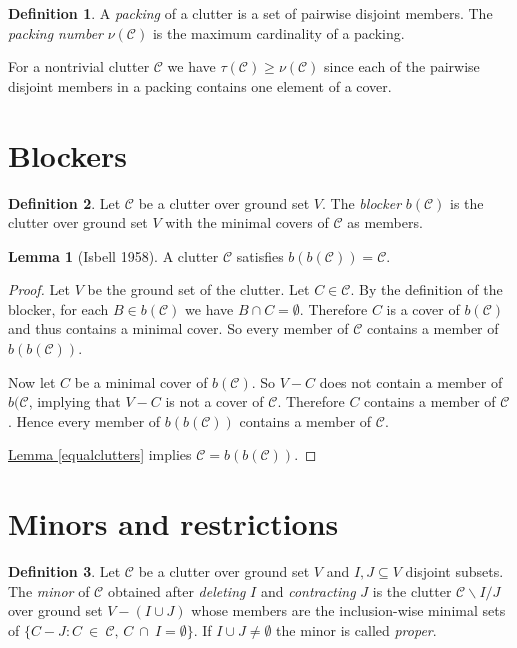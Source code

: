 \documentclass[a4paper, 12pt, twoside=false]{scrbook}
\theoremstyle{definition}
\newtheorem*{definition}{Definition}
\newtheorem{lemma}[theorem]{Lemma}
\begin{document}
\begin{definition}
    A \emph{packing} of a clutter is a set of pairwise disjoint members.
    The \emph{packing number} $\nu(\mathcal{C})$ is the maximum cardinality of a packing.
\end{definition}

For a nontrivial clutter $\mathcal{C}$ we have $\tau(\mathcal{C}) \geq \nu(\mathcal{C})$ since each of the pairwise disjoint members in a packing contains one element of a cover.

\section{Blockers}
\begin{definition}
    Let $\mathcal{C}$ be a clutter over ground set $V$.
    The \emph{blocker} $b(\mathcal{C})$ is the clutter over ground set $V$ with the minimal covers of $\mathcal{C}$ as members.
\end{definition}

\begin{lemma}[Isbell 1958]
    A clutter $\mathcal{C}$ satisfies $b(b(\mathcal{C}))=\mathcal{C}$.
\end{lemma}

\begin{proof}
    Let $V$ be the ground set of the clutter.
    Let $C \in \mathcal{C}$.
    By the definition of the blocker, for each $B \in b(\mathcal{C})$ we have $B\cap C = \emptyset$.
    Therefore $C$ is a cover of $b(\mathcal{C})$ and thus contains a minimal cover.
    So every member of $\mathcal{C}$ contains a member of $b(b(\mathcal{C}))$.

    Now let $C$ be a minimal cover of $b(\mathcal{C})$.
    So $V-C$ does not contain a member of $b(\mathcal{C}$, implying that $V-C$ is not a cover of $\mathcal{C}$.
    Therefore $C$ contains a member of $\mathcal{C}$.
    Hence every member of $b(b(\mathcal{C}))$ contains a member of $\mathcal{C}$.

    \hyperref[equalclutters]{Lemma \ref*{equalclutters}} implies $\mathcal{C}=b(b(\mathcal{C}))$.
\end{proof}


\section{Minors and restrictions}
\begin{definition}
    Let $\mathcal{C}$ be a clutter over ground set $V$ and $I, J \subseteq V$ disjoint subsets.
    The \emph{minor} of $\mathcal{C}$ obtained after \emph{deleting} $I$ and \emph{contracting} $J$ is the clutter $\mathcal{C} \backslash I / J$ over ground set $V - (I \cup J)$ whose members are the inclusion-wise minimal sets of $\{C-J : C~\in~\mathcal{C},\, C~\cap~I = \emptyset\}$.
    If $I \cup J \neq \emptyset$ the minor is called \emph{proper}.
\end{definition}
\end{document}
